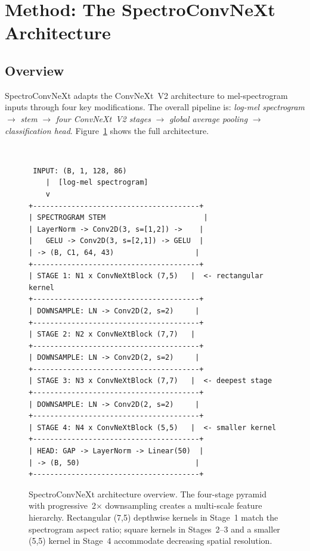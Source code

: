 \documentclass{article}
\begin{document}
\section{Method: The SpectroConvNeXt Architecture}

\subsection{Overview}

SpectroConvNeXt adapts the ConvNeXt~V2 architecture to mel-spectrogram inputs
through four key modifications. The overall pipeline is: \emph{log-mel
spectrogram} $\rightarrow$ \emph{stem} $\rightarrow$ \emph{four ConvNeXt~V2
stages} $\rightarrow$ \emph{global average pooling} $\rightarrow$
\emph{classification head}. Figure~\ref{fig:arch} shows the full architecture.

\begin{figure}[h]
  \centering
  \begin{minipage}{0.92\linewidth}
  \small\tt
  \begin{verbatim}
 INPUT: (B, 1, 128, 86)
    |  [log-mel spectrogram]
    v
+---------------------------------------+
| SPECTROGRAM STEM                       |
| LayerNorm -> Conv2D(3, s=[1,2]) ->    |
|   GELU -> Conv2D(3, s=[2,1]) -> GELU  |
| -> (B, C1, 64, 43)                   |
+---------------------------------------+
| STAGE 1: N1 x ConvNeXtBlock (7,5)   |  <- rectangular kernel
+---------------------------------------+
| DOWNSAMPLE: LN -> Conv2D(2, s=2)     |
+---------------------------------------+
| STAGE 2: N2 x ConvNeXtBlock (7,7)   |
+---------------------------------------+
| DOWNSAMPLE: LN -> Conv2D(2, s=2)     |
+---------------------------------------+
| STAGE 3: N3 x ConvNeXtBlock (7,7)   |  <- deepest stage
+---------------------------------------+
| DOWNSAMPLE: LN -> Conv2D(2, s=2)     |
+---------------------------------------+
| STAGE 4: N4 x ConvNeXtBlock (5,5)   |  <- smaller kernel
+---------------------------------------+
| HEAD: GAP -> LayerNorm -> Linear(50)  |
| -> (B, 50)                           |
+---------------------------------------+
  \end{verbatim}
  \end{minipage}
  \caption{SpectroConvNeXt architecture overview. The four-stage pyramid with
  progressive~2$\times$ downsampling creates a multi-scale feature hierarchy.
  Rectangular (7,5) depthwise kernels in Stage~1 match the spectrogram aspect
  ratio; square kernels in Stages~2--3 and a smaller (5,5) kernel in Stage~4
  accommodate decreasing spatial resolution.}
  \label{fig:arch}
\end{figure}
\end{document}
